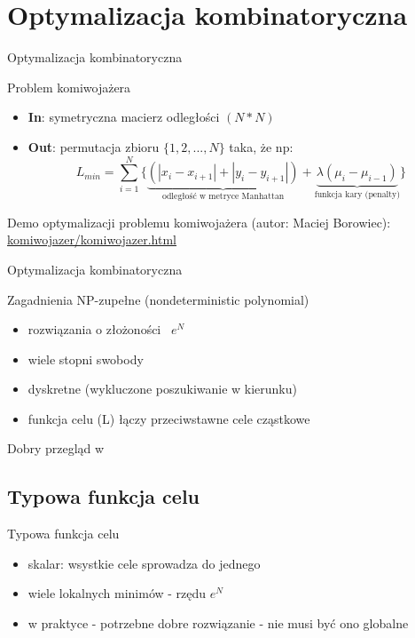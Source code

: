 \section{Optymalizacja kombinatoryczna}

	\begin{frame}{Optymalizacja kombinatoryczna }
		\begin{exampleblock}{Problem komiwojażera}
			\begin{itemize}
				\item \textbf{In}: symetryczna macierz odległości $(N*N)$
						
				\item \textbf{Out}: permutacja zbioru $\{1,2,...,N\}$ taka, że np:
					$$
						L_{min} = \sum_{i=1}^N \{ \underbrace{(|x_i - x_{i+1}| + |y_i - y_{i+1}|)}_\text{odległość w metryce Manhattan} + \underbrace{\lambda(\mu_i - \mu_{i-1})}_\text{funkcja kary (penalty)}\}
					$$
			\end{itemize}		
			Demo optymalizacji problemu komiwojażera (autor: Maciej Borowiec): \url{komiwojazer/komiwojazer.html} 
		\end{exampleblock}
		
	\end{frame}

	\begin{frame}{Optymalizacja kombinatoryczna}
		\begin{exampleblock}{Zagadnienia NP-zupełne (nondeterministic polynomial)}
			\begin{itemize}
				\item rozwiązania o złożoności ~$e^N$
				\item wiele stopni swobody
				\item dyskretne (wykluczone poszukiwanie w kierunku)
				\item funkcja celu (L) łączy przeciwstawne cele cząstkowe			
			\end{itemize}
		\end{exampleblock}
		Dobry przegląd w \cite{garey}
	\end{frame}
	
\subsection{Typowa funkcja celu}
	\begin{frame}{Typowa funkcja celu}
		\begin{itemize}
			\item skalar: wsystkie cele sprowadza do jednego
			\item wiele lokalnych minimów - rzędu $e^N$
			\item w praktyce - potrzebne dobre rozwiązanie - nie musi być ono globalne			
		\end{itemize}

	\end{frame}

